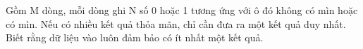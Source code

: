 Gồm M dòng, mỗi dòng ghi N số 0 hoặc 1 tương ứng với ô đó không có mìn hoặc có mìn. Nếu có nhiều kết quả thỏa mãn, chỉ cần đưa ra một kết   quả duy nhất. Biết rằng dữ liệu vào luôn đảm bảo có ít nhất một kết quả.